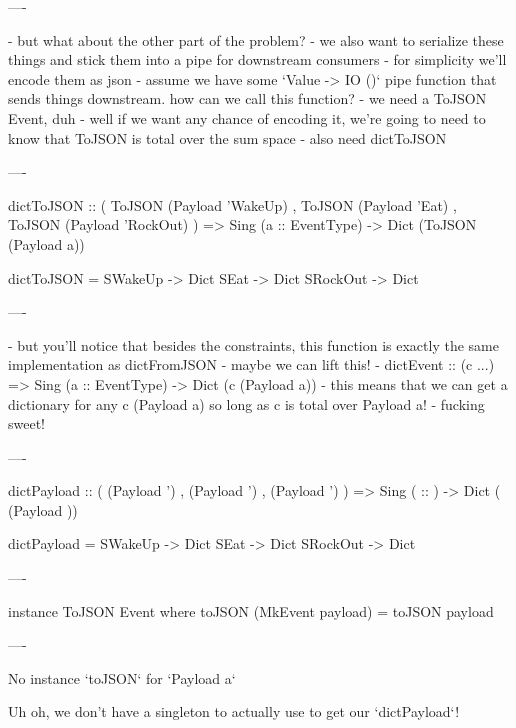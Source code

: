 ----

- but what about the other part of the problem?
  - we also want to serialize these things and stick them into a pipe for downstream consumers
  - for simplicity we'll encode them as json
  - assume we have some `Value -> IO ()` pipe function that sends things downstream. how can we call this function?
    - we need a ToJSON Event, duh
    - well if we want any chance of encoding it, we're going to need to know that ToJSON is total over the sum space
    - also need dictToJSON

----

\begin{hs}
  dictToJSON :: ( ToJSON (Payload 'WakeUp)
                , ToJSON (Payload 'Eat)
                , ToJSON (Payload 'RockOut)
                )
             => Sing (a :: EventType)
             -> Dict (ToJSON (Payload a))

  dictToJSON = \case
    SWakeUp  -> Dict
    SEat     -> Dict
    SRockOut -> Dict
\end{hs}

----

- but you'll notice that besides the constraints, this function is exactly the same implementation as dictFromJSON
  - maybe we can lift this!
    - dictEvent :: (c ...) => Sing (a :: EventType) -> Dict (c (Payload a))
  - this means that we can get a dictionary for any c (Payload a) so long as c is total over Payload a!
    - fucking sweet!

----

\begin{raw}
  dictPayload :: (  (Payload ')
                 ,  (Payload ')
                 ,  (Payload ')
                 )
              => Sing ( :: )
              -> Dict ( (Payload ))

  dictPayload = \case
    SWakeUp  -> Dict
    SEat     -> Dict
    SRockOut -> Dict
\end{raw}

----

\begin{hs}
  instance ToJSON Event where
    toJSON (MkEvent payload) = toJSON payload
\end{hs}

----

No instance `toJSON` for `Payload a`

Uh oh, we don't have a singleton to actually use to get our `dictPayload`!

